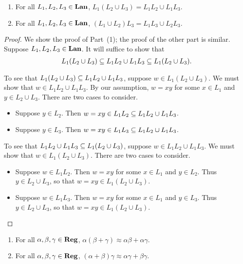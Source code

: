 \begin{proposition}
\label{DistribLan}
\begin{enumerate}[(1)]
\item For all $L_1,L_2,L_3\in\mathbf{Lan}$,
$L_1(L_2\cup L_3) = L_1L_2\cup L_1L_3$.

\item For all $L_1,L_2,L_3\in\mathbf{Lan}$,
$(L_1\cup L_2)L_3 = L_1L_3\cup L_2L_3$.
\end{enumerate}
\end{proposition}

\begin{proof}
We show the proof of Part~(1); the proof of the other part is
similar.  Suppose $L_1,L_2,L_3\in\mathbf{Lan}$.  It will suffice to show that
\begin{gather*}
L_1(L_2\cup L_3)\subseteq L_1L_2\cup L_1L_3\subseteq L_1(L_2\cup L_3).
\end{gather*}

To see that
$L_1(L_2\cup L_3)\subseteq L_1L_2\cup L_1L_3$, suppose
$w\in L_1(L_2\cup L_3)$.  We must show that $w\in L_1L_2\cup L_1L_3$.
By our assumption, $w=xy$ for some $x\in L_1$ and $y\in L_2\cup L_3$.
There are two cases to consider.
\begin{itemize}
\item Suppose $y\in L_2$.  Then $w=xy\in L_1L_2\subseteq L_1L_2\cup L_1L_3$.

\item Suppose $y\in L_3$.  Then $w=xy\in L_1L_3\subseteq L_1L_2\cup L_1L_3$.
\end{itemize}

To see that $L_1L_2\cup L_1L_3\subseteq L_1(L_2\cup L_3)$, suppose
$w\in L_1L_2\cup L_1L_3$.  We must show that $w\in L_1(L_2\cup L_3)$.
There are two cases to consider.
\begin{itemize}
\item Suppose $w\in L_1L_2$.  Then $w=xy$ for some $x\in L_1$ and $y\in L_2$.
Thus $y\in L_2\cup L_3$, so that $w=xy\in L_1(L_2\cup L_3)$.

\item Suppose $w\in L_1L_3$.  Then $w=xy$ for some $x\in L_1$ and $y\in L_3$.
Thus $y\in L_2\cup L_3$, so that $w=xy\in L_1(L_2\cup L_3)$.
\end{itemize}
\end{proof}

\begin{proposition}
\label{DistribReg}
\begin{enumerate}[(1)]
\item For all $\alpha,\beta,\gamma\in\mathbf{Reg}$,
$\alpha(\beta+\gamma)\approx \alpha\beta+\alpha\gamma$.

\item For all $\alpha,\beta,\gamma\in\mathbf{Reg}$,
$(\alpha+\beta)\gamma\approx \alpha\gamma+\beta\gamma$.
\end{enumerate}
\end{proposition}

